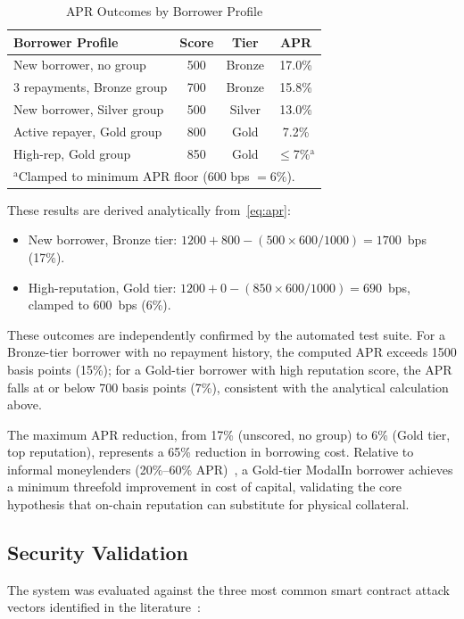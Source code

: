 \documentclass[conference]{IEEEtran}
\begin{document}
\begin{table}[t]
\caption{APR Outcomes by Borrower Profile}
\label{tab:apr}
\centering
\begin{tabular}{p{3.1cm}ccc}
\toprule
\textbf{Borrower Profile} & \textbf{Score} & \textbf{Tier} & \textbf{APR} \\
\midrule
New borrower, no group       & 500 & Bronze & 17.0\% \\
3 repayments, Bronze group   & 700 & Bronze & 15.8\% \\
New borrower, Silver group   & 500 & Silver & 13.0\% \\
Active repayer, Gold group   & 800 & Gold   & 7.2\%  \\
High-rep, Gold group         & 850 & Gold   & $\leq$7\%$^{\mathrm{a}}$ \\
\midrule
\multicolumn{4}{l}{$^{\mathrm{a}}$Clamped to minimum APR floor (600 bps $= 6\%$).}
\end{tabular}
\end{table}

These results are derived analytically from~\eqref{eq:apr}:
%
\begin{itemize}
\item New borrower, Bronze tier:
  $1200 + 800 - (500 \times 600 / 1000) = 1700$~bps (17\%).
\item High-reputation, Gold tier:
  $1200 + 0 - (850 \times 600 / 1000) = 690$~bps, clamped to 600~bps (6\%).
\end{itemize}
%
These outcomes are independently confirmed by the automated test suite.
For a Bronze-tier borrower with no repayment history, the computed APR exceeds
1500 basis points (15\%); for a Gold-tier borrower with high reputation score,
the APR falls at or below 700 basis points (7\%), consistent with the
analytical calculation above.

The maximum APR reduction, from 17\% (unscored, no group) to 6\% (Gold
tier, top reputation), represents a 65\% reduction in borrowing cost.
Relative to informal moneylenders (20\%--60\% APR)~\cite{b9}, a Gold-tier
ModalIn borrower achieves a minimum threefold improvement in cost of capital,
validating the core hypothesis that on-chain reputation can substitute for
physical collateral.

\subsection{Security Validation}

The system was evaluated against the three most common smart contract attack
vectors identified in the literature~\cite{b25}:
\end{document}
